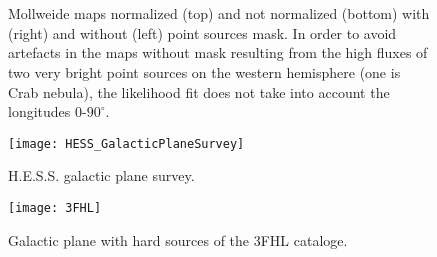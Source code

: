 \documentclass[a4paper]{article}
\begin{document}
\newpage
\begin{figure}[h]
	\\
	\\
\caption{Mollweide maps normalized (top) and not normalized (bottom) with (right) and without (left) point sources mask. In order to avoid artefacts in the maps without mask resulting from the high fluxes of two very bright point sources on the western hemisphere (one is Crab nebula), the likelihood fit does not take into account the longitudes 0-$90^\circ$.}
\label{Fit_IC_pi0_to_ROI}
\end{figure}

\begin{figure}[h]
	\centering
	\texttt{[image: HESS\_GalacticPlaneSurvey]}
    \caption{H.E.S.S.
     galactic plane survey.}
    \label{TotalData_Sum}
\end{figure}
\begin{figure}[h]
	\centering
	\texttt{[image: 3FHL]}
    \caption{Galactic plane with hard sources of the 3FHL cataloge.}
    \label{TotalData_Sum}
\end{figure}
\end{document}

